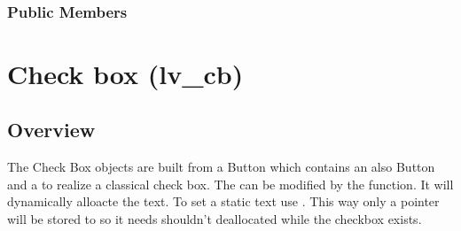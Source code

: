 \documentclass[letterpaper,10pt,english]{sphinxmanual}
\begin{document}
\begin{fulllineitems}
\label{\detokenize{object-types/canvas:_CPPv415lv_canvas_ext_t}}%
\pysigstartmultiline
{}\label{\detokenize{object-types/canvas:structlv__canvas__ext__t}}%
\pysigstopmultiline~\subsubsection*{Public Members}

\begin{fulllineitems}
\label{\detokenize{object-types/canvas:_CPPv4N15lv_canvas_ext_t3imgE}}%
\pysigstartmultiline
{}%
\pysigstopmultiline
\end{fulllineitems}


\begin{fulllineitems}
\label{\detokenize{object-types/canvas:_CPPv4N15lv_canvas_ext_t3dscE}}%
\pysigstartmultiline
{}%
\pysigstopmultiline
\end{fulllineitems}


\end{fulllineitems}



\section{Check box (lv\_cb)}
\label{\detokenize{object-types/cb:check-box-lv-cb}}\label{\detokenize{object-types/cb::doc}}

\subsection{Overview}
\label{\detokenize{object-types/cb:overview}}
The Check Box objects are built from a Button  which contains an also Button  and a  to realize a classical check box.
The  can be modified by the  function. It will dynamically alloacte the text.
To set a static text use . This way only a pointer will be stored to  so it needs shouldn’t deallocated while the checkbox exists.
\end{document}
